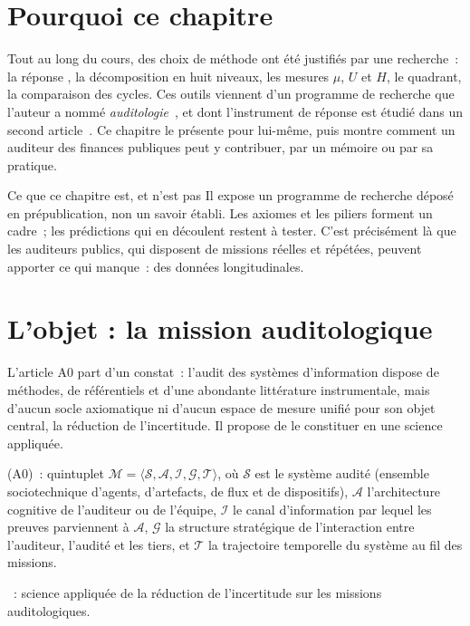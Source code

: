 \bigskip

\section*{Pourquoi ce chapitre}

Tout au long du cours, des choix de méthode ont été justifiés par une
recherche~: la réponse \NEK{}, la décomposition en huit niveaux, les mesures
$\mu$, $U$ et $H$, le quadrant, la comparaison des cycles. Ces outils
viennent d'un programme de recherche que l'auteur a nommé
\emph{auditologie}~\cite{minka2026auditologie}, et dont l'instrument de
réponse est étudié dans un second article~\cite{minka2026nek}. Ce chapitre
le présente pour lui-même, puis montre comment un auditeur des finances
publiques peut y contribuer, par un mémoire ou par sa pratique.

\begin{boiteRemarque}{Ce que ce chapitre est, et n'est pas}
Il expose un programme de recherche déposé en prépublication, non un savoir
établi. Les axiomes et les piliers forment un cadre~; les prédictions qui en
découlent restent à tester. C'est précisément là que les auditeurs publics,
qui disposent de missions réelles et répétées, peuvent apporter ce qui
manque~: des données longitudinales.
\end{boiteRemarque}

\separateur

\section{L'objet : la mission auditologique}
\label{sec:c15-objet}

L'article A0 part d'un constat~: l'audit des systèmes d'information dispose
de méthodes, de référentiels et d'une abondante littérature instrumentale,
mais d'aucun socle axiomatique ni d'aucun espace de mesure unifié pour son
objet central, la réduction de l'incertitude. Il propose de le constituer en
une science appliquée.

\begin{boxdef}
 (A0)~:
quintuplet
$\mathcal{M} = \langle \mathcal{S}, \mathcal{A}, \mathcal{I},
\mathcal{G}, \mathcal{T} \rangle$, où $\mathcal{S}$ est le système audité
(ensemble sociotechnique d'agents, d'artefacts, de flux et de dispositifs),
$\mathcal{A}$ l'architecture cognitive de l'auditeur ou de l'équipe,
$\mathcal{I}$ le canal d'information par lequel les preuves parviennent à
$\mathcal{A}$, $\mathcal{G}$ la structure stratégique de l'interaction
entre l'auditeur, l'audité et les tiers, et $\mathcal{T}$ la trajectoire
temporelle du système au fil des missions.

\medskip
{}~: science appliquée de la
réduction de l'incertitude sur les missions auditologiques.
\end{boxdef}

